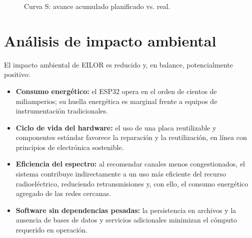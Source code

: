 \begin{figure}[H]
\centering
{}
\caption{Curva S: avance acumulado planificado vs. real.}
\label{fig:curvas}
\end{figure}

\section{Análisis de impacto ambiental}
El impacto ambiental de EILOR es reducido y, en balance, potencialmente positivo:
\begin{itemize}[leftmargin=1.4em]
  \item \textbf{Consumo energético:} el ESP32 opera en el orden de cientos de miliamperios; su huella energética es marginal frente a equipos de instrumentación tradicionales.
  \item \textbf{Ciclo de vida del hardware:} el uso de una placa reutilizable y componentes estándar favorece la reparación y la reutilización, en línea con principios de electrónica sostenible.
  \item \textbf{Eficiencia del espectro:} al recomendar canales menos congestionados, el sistema contribuye indirectamente a un uso más eficiente del recurso radioeléctrico, reduciendo retransmisiones y, con ello, el consumo energético agregado de las redes cercanas.
  \item \textbf{Software sin dependencias pesadas:} la persistencia en archivos y la ausencia de bases de datos y servicios adicionales minimizan el cómputo requerido en operación.
\end{itemize}

